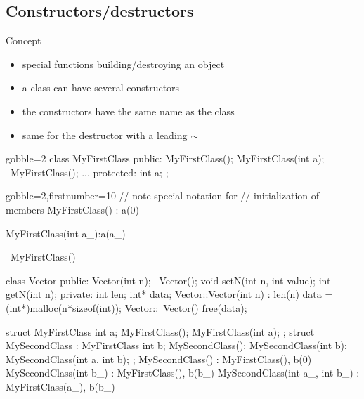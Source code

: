 \subsection[construct]{Constructors/destructors}

\begin{frame}[fragile]
  \begin{block}{Concept}
    \begin{itemize}
    \item special functions building/destroying an object
    \item a class can have several constructors
    \item the constructors have the same name as the class
    \item same for the destructor with a leading $\sim$
    \end{itemize}
  \end{block}
  \begin{multicols}{2}
    \begin{cppcode*}{gobble=2}
      class MyFirstClass {
      public:
        MyFirstClass();
        MyFirstClass(int a);
        ~MyFirstClass();
        ...
      protected:
        int a;
      };
    \end{cppcode*}
    \columnbreak
    \begin{cppcode*}{gobble=2,firstnumber=10}
      // note special notation for
      // initialization of members
      MyFirstClass() : a(0) {}

      MyFirstClass(int a_):a(a_) {}

      ~MyFirstClass() {}
    \end{cppcode*}
  \end{multicols}
\end{frame}


\begin{frame}[fragile]
  \begin{cppcode}
    class Vector {
    public:
      Vector(int n);
      ~Vector();
      void setN(int n, int value);
      int getN(int n);
    private:
      int len;
      int* data;
    }
    Vector::Vector(int n) : len(n) {
      data = (int*)malloc(n*sizeof(int));
    }
    Vector::~Vector() {
      free(data);
    }
  \end{cppcode}
\end{frame}

\begin{frame}[fragile]
  \begin{cppcode}
    struct MyFirstClass {
      int a;
      MyFirstClass();
      MyFirstClass(int a);
    };
    struct MySecondClass : MyFirstClass {
      int b;
      MySecondClass();
      MySecondClass(int b);
      MySecondClass(int a, int b);
    };
    MySecondClass() : MyFirstClass(), b(0) {}
    MySecondClass(int b_) : MyFirstClass(), b(b_) {}
    MySecondClass(int a_,
                  int b_) : MyFirstClass(a_), b(b_) {}
  \end{cppcode}
\end{frame}

